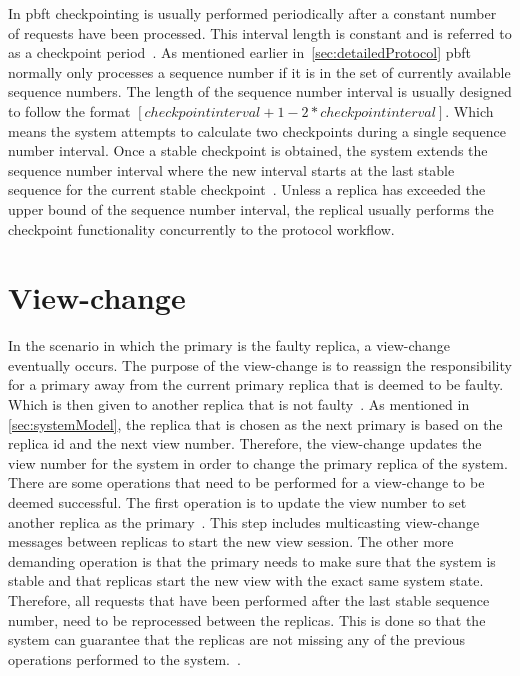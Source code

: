 In \ac{pbft} checkpointing is usually performed periodically after a constant number of requests have been processed. This interval length is constant and is referred to as a checkpoint period~\cites[p.~261]{BOOK:BuildDepDistSyst}[p.~410]{PAPER:PBFTRecovery}. As mentioned earlier in~\autoref{sec:detailedProtocol} \ac{pbft} normally only processes a sequence number if it is in the set of currently available sequence numbers. The length of the sequence number interval is usually designed to follow the format $[checkpointinterval+1-2*checkpointinterval]$. Which means the system attempts to calculate two checkpoints during a single sequence number interval. Once a stable checkpoint is obtained, the system extends the sequence number interval where the new interval starts at the last stable sequence for the current stable checkpoint~\cites[p.~5]{PAPER:OGPBFT}[p.~410]{PAPER:PBFTRecovery}. Unless a replica has exceeded the upper bound of the sequence number interval, the replical usually performs the checkpoint functionality concurrently to the protocol workflow.

\section{View-change}
\label{sec:view-change}
In the scenario in which the primary is the faulty replica, a view-change eventually occurs. The purpose of the view-change is to reassign the responsibility for a primary away from the current primary replica that is deemed to be faulty. Which is then given to another replica that is not faulty~\cites{WEB:PBFTConSeries}[p.262]{BOOK:BuildDepDistSyst}. As mentioned in \autoref{sec:systemModel}, the replica that is chosen as the next primary is based on the replica id and the next view number. Therefore, the view-change updates the view number for the system in order to change the primary replica of the system. There are some operations that need to be performed for a view-change to be deemed successful. The first operation is to update the view number to set another replica as the primary~\cites[p.~6]{PAPER:OGPBFT}[p.~411]{PAPER:PBFTRecovery}{WEB:SawtoothPBFT}. This step includes multicasting view-change messages between replicas to start the new view session. The other more demanding operation is that the primary needs to make sure that the system is stable and that replicas start the new view with the exact same system state. Therefore, all requests that have been performed after the last stable sequence number, need to be reprocessed between the replicas. This is done so that the system can guarantee that the replicas are not missing any of the previous operations performed to the system.~\cites[p.~458]{BOOK:MVstandver3}[p.~263-265]{BOOK:BuildDepDistSyst}.

